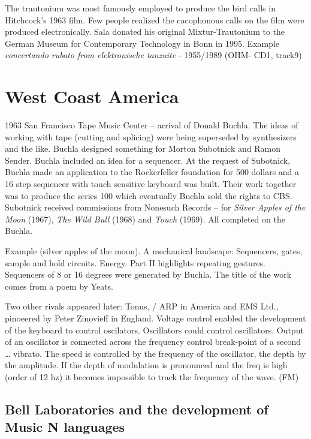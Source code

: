 The trautonium was most famously employed to produce the bird calls in Hitchcock's 1963 film. Few people realized the cacophonous calls on the film were produced electronically. Sala donated his original Mixtur-Trautonium to the German Museum for Contemporary Technology in Bonn in 1995. Example \textit{concertando rubato from elektronische tanzuite} - 1955/1989 (OHM- CD1, track9)

\section{West Coast America}
1963 San Francisco Tape Music Center – arrival of Donald Buchla. The ideas of working with tape (cutting and splicing) were being superseded by synthesizers and the like. Buchla designed something for Morton Subotnick and Ramon Sender. Buchla included an idea for a sequencer. At the request of Subotnick, Buchla made an application to the Rockerfeller foundation for 500 dollars and a 16 step sequencer with touch sensitive keyboard was built. Their work together was to produce the series 100 which eventually Buchla sold the rights to CBS. Subotnick received commissions from Nonesuch Records – for \textit{Silver Apples of the Moon} (1967), \textit{The Wild Bull} (1968) and \textit{Touch} (1969). All completed on the Buchla.

Example (silver apples of the moon). A mechanical landscape: Sequencers, gates, sample and hold circuits. Energy. Part II highlights repeating gestures. Sequencers of 8 or 16 degrees were generated by Buchla. The title of the work comes from a poem by Yeats.

Two other rivals appeared later: Tonus, / ARP in America and EMS Ltd., pinoeered by Peter Zinovieff in England. Voltage control enabled the development of the keyboard to control oscilators. Oscillators could control oscillators. Output of an oscillator is connected across the frequency control break-point of a second … vibrato. The speed is controlled by the frequency of the oscillator, the depth by the amplitude. If the depth of modulation is pronounced and the freq is high (order of 12 hz) it becomes impossible to track the frequency of the wave. (FM)



\subsection{Bell Laboratories and the development of Music N languages}

